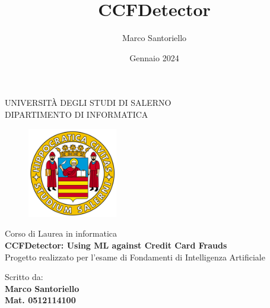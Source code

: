 \documentclass[]{article}
\title{CCFDetector}
\author{Marco Santoriello}
\date{Gennaio 2024}
\begin{document}
\begin{titlepage}
    \begin{center}
        \LARGE{\uppercase{Università degli Studi di Salerno}}\\
        \vspace{5mm}
    	\uppercase{\normalsize Dipartimento di Informatica}\\
    \end{center}
    \begin{figure}[H]
        \centering
        \includegraphics[width=0.35\textwidth]{img/logo_unisa.png}
    \end{figure}

    \begin{center}
    	\normalsize{ Corso di Laurea in informatica }\\
    	\vspace{15mm}
        {\LARGE{\bf CCFDetector: Using ML against Credit Card Frauds }}\\
        {\large{ Progetto realizzato per l'esame di Fondamenti di Intelligenza Artificiale}}\\
    	\vspace{10mm}
    \end{center}
    \begin{minipage}[t]{0.4\textwidth}\raggedright
    	{\large{Scritto da: \\ \bf Marco Santoriello\\ Mat. 0512114100}}
    \end{minipage}

    \vspace{90mm}

\end{titlepage}

\setcounter{tocdepth}{3} %

\tableofcontents
\newpage
\end{document}
